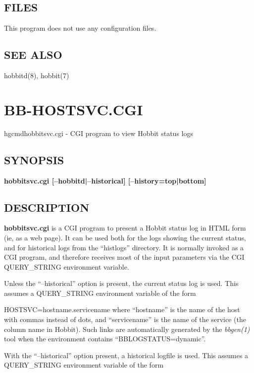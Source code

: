\subsection{FILES}
 This program does not use any configuration files. 

 
\subsection{SEE ALSO}
hobbitd(8), hobbit(7) 

 
%
\newpage
\section{BB-HOSTSVC.CGI}

hgcmd{hobbitsvc.cgi} - CGI program to view Hobbit status logs

\subsection{SYNOPSIS}
\textbf{hobbitsvc.cgi [--hobbitd|--historical] [--history={top|bottom}]}



\subsection{DESCRIPTION}
\textbf{hobbitsvc.cgi}
 is a CGI program to present a Hobbit status log in HTML form (ie, as a web page). It can be used both for the logs showing the current status, and for historical logs from the ``histlogs'' directory. It is normally invoked as a CGI program, and therefore receives most of the input parameters via the CGI QUERY\_STRING environment variable. 

  Unless the ``--historical'' option is present, the current status log is used. This assumes a QUERY\_STRING environment variable of the form  
 
HOSTSVC=hostname.servicename  
 where ``hostname'' is the name of the host with commas instead of dots, and ``servicename'' is the name of the service (the column name in Hobbit). Such links are automatically generated by the \emph{bbgen(1)}
 tool when the environment contains ``BBLOGSTATUS=dynamic''. 


  With the ``--historical'' option present, a historical logfile is used. This assumes a QUERY\_STRING environment variable of the form  
 
